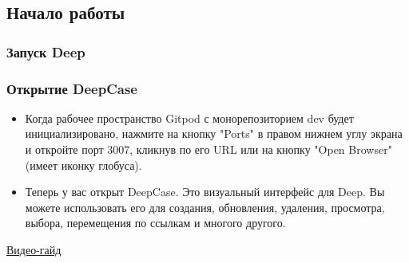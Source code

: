 \subsection{Начало работы}
\subsubsection{Запуск Deep}

\subsubsection{Открытие DeepCase}
\begin{itemize}
  \item Когда рабочее пространство Gitpod с монорепозиторием dev будет инициализировано, нажмите на кнопку "Ports" в правом нижнем углу экрана и откройте порт 3007, кликнув по его URL или на кнопку "Open Browser" (имеет иконку глобуса).
  \item Теперь у вас открыт DeepCase. Это визуальный интерфейс для Deep. Вы можете использовать его для создания, обновления, удаления, просмотра, выбора, перемещения по ссылкам и многого другого.
\end{itemize}
\href{https://youtu.be/0lbcPGV17mQ}{Видео-гайд}
